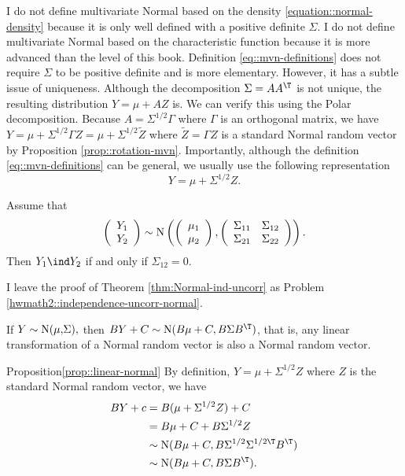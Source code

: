 I do not define multivariate Normal based on the density \eqref{equation::normal-density} because it is only well defined with a positive definite $\Sigma$. I do not define multivariate Normal based on the characteristic function because it is more advanced than the level of this book.
Definition \eqref{eq::mvn-definitions} does not require $\Sigma$ to be positive definite and is more elementary. 
However, it has a subtle issue of uniqueness. Although
the decomposition $\Sigma=AA^{\T}$ is not unique, the resulting distribution
$Y=\mu+AZ$ is. We can verify this using the Polar decomposition. 
Because $A=\Sigma^{1/2}\Gamma$ where $\Gamma$ is an orthogonal matrix,
we have $Y=\mu+\Sigma^{1/2}\Gamma Z=\mu+\Sigma^{1/2}\tilde{Z}$ where
$\tilde{Z}=\Gamma Z$ is a standard Normal random vector by Proposition \ref{prop::rotation-mvn}.
Importantly, although the definition \eqref{eq::mvn-definitions} can be general, we usually use the following representation
$$
Y=\mu+ \Sigma^{1/2} Z.
$$



\begin{theorem}
\label{thm:Normal-ind-uncorr}Assume that
\[
\left(\begin{array}{c}
Y_{1}\\
Y_{2}
\end{array}\right)\sim\textup{N}\left(\left(\begin{array}{c}
\mu_{1}\\
\mu_{2}
\end{array}\right),\left(\begin{array}{cc}
\Sigma_{11} & \Sigma_{12}\\
\Sigma_{21} & \Sigma_{22}
\end{array}\right)\right).
\]
Then $Y_{1}\ind Y_{2}$ if and only if $\Sigma_{12}=0.$
\end{theorem}
%
I leave the proof of Theorem \ref{thm:Normal-ind-uncorr} as Problem \ref{hwmath2::independence-uncorr-normal}.



\begin{proposition}\label{prop::linear-normal}
If $Y\sim\textup{N(\ensuremath{\mu,}\ensuremath{\Sigma})},$ then $BY+C\sim\textup{N\ensuremath{(B\mu+C,B\Sigma B^{\T}})}$,
that is, any linear transformation of a Normal random vector is also
a Normal random vector.
\end{proposition}
%
\begin{myproof}{Proposition}{\ref{prop::linear-normal}}
By definition, $Y=\mu+\Sigma^{1/2}Z$ where $Z$ is the standard Normal
random vector, we have 
\begin{align*}
BY+c & =B(\mu+\Sigma^{1/2}Z)+C\\
 & =B\mu+C+B\Sigma^{1/2}Z\\
 & \sim\text{N}(B\mu+C,B\Sigma^{1/2}\Sigma^{1/2\T}B^{\T})\\
 & \sim\text{N}(B\mu+C,B\Sigma B^{\T}).
\end{align*}
\end{myproof}



